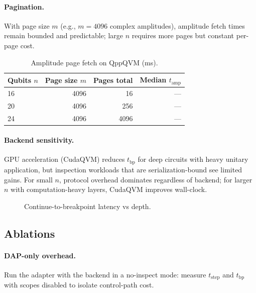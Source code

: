 \documentclass[12pt]{article}
\begin{document}
\begin{itemize}
\paragraph{Pagination.}
With page size $m$ (e.g., $m=4096$ complex amplitudes), amplitude fetch times remain bounded and predictable; large $n$ requires more pages but constant per-page cost.

\begin{table}[t]
\centering
\caption{Amplitude page fetch on QppQVM (ms).}
\begin{tabular}{lrrr}
\hline
Qubits $n$ & Page size $m$ & Pages total & Median $t_{\mathrm{amp}}$ \\
\hline
16 & 4096  & 16  & --- \\
20 & 4096  & 256 & --- \\
24 & 4096  & 4096 & --- \\
\hline
\end{tabular}
\label{tab:amp}
\end{table}

\paragraph{Backend sensitivity.}
GPU acceleration (CudaQVM) reduces $t_{\mathrm{bp}}$ for deep circuits with heavy unitary application, but inspection workloads that are serialization-bound see limited gains. For small $n$, protocol overhead dominates regardless of backend; for larger $n$ with computation-heavy layers, CudaQVM improves wall-clock.

\begin{figure}[t]
\centering
{}
\caption{Continue-to-breakpoint latency vs depth.}
\label{fig:crossover}
\end{figure}

\subsection{Ablations}

\paragraph{DAP-only overhead.}
Run the adapter with the backend in a no-inspect mode: measure $t_{\mathrm{step}}$ and $t_{\mathrm{bp}}$ with scopes disabled to isolate control-path cost.


\end{itemize}
\end{document}
